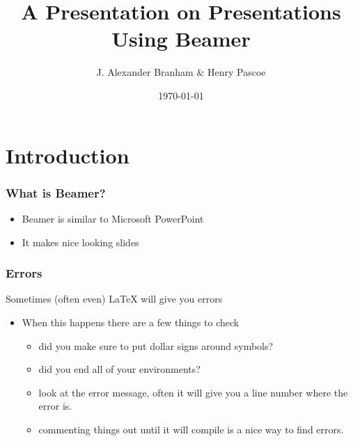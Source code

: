 \documentclass{beamer}
\title{A Presentation on Presentations Using Beamer}
\author{ J. Alexander Branham \& Henry Pascoe}
\institute{The University of Texas at Austin}
\date{\today}
\begin{document}
\frame{\titlepage}




\section{Introduction}

\begin{frame}
\frametitle{What is Beamer?}

\begin{itemize}
\item Beamer is similar to Microsoft PowerPoint 
\pause
\item It makes nice looking slides
\end{itemize}
\end{frame}


\begin{frame}
\frametitle{Errors}

Sometimes (often even) LaTeX will give you errors

\begin{itemize}

\item When this happens there are a few things to check 
\begin{itemize}
\item did you make sure to put dollar signs around symbols?

\item did you end all of your environments?

\item look at the error message, often it will give you a line number where the error is. 

\item commenting things out until it will compile is a nice way to find errors. 
\end{itemize}
\end{itemize}

\end{frame}
\end{document}
